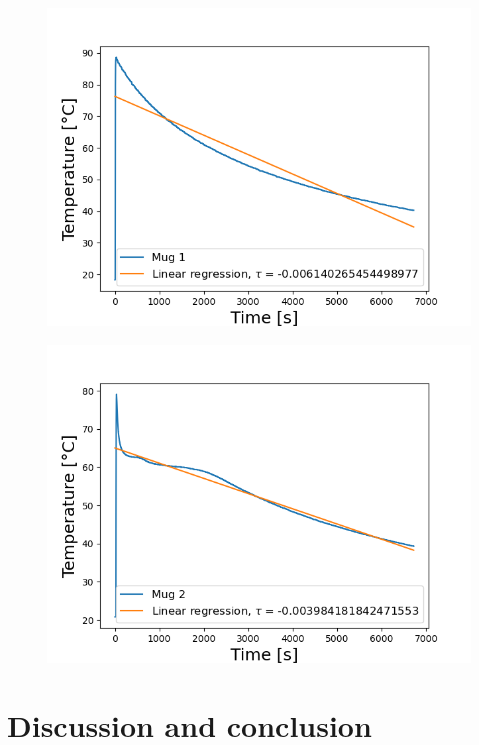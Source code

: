\documentclass[reprint,english,notitlepage]{revtex4-2}
\begin{document}
\begin{figure}
  \includegraphics[scale=0.5]{tau_t.png}
  \caption{}\label{fig:tau_t}
\end{figure}
\FloatBarrier

\begin{figure}
  \includegraphics[scale=0.5]{tau_b.png}
  \caption{}\label{fig: tau_b}
\end{figure}
\FloatBarrier

\section{Discussion and conclusion}
\end{document}

